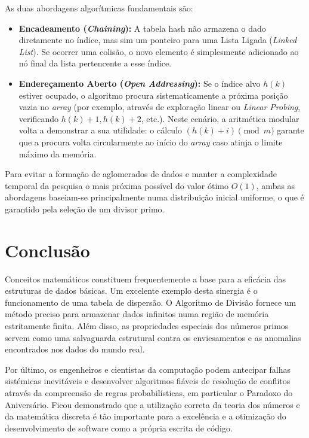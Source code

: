 \documentclass[12pt, a4paper]{article}
\begin{document}
As duas abordagens algorítmicas fundamentais são:
\begin{itemize}
    \item \textbf{Encadeamento (\textit{Chaining}):} A tabela hash não armazena o dado diretamente no índice, mas sim um ponteiro para uma Lista Ligada (\textit{Linked List}). 
    Se ocorrer uma colisão, o novo elemento é simplesmente adicionado ao nó final da lista pertencente a esse índice.
    \item \textbf{Endereçamento Aberto (\textit{Open Addressing}):} Se o índice alvo $h(k)$ estiver ocupado, o algoritmo procura sistematicamente a próxima posição vazia no \textit{array} 
    (por exemplo, através de exploração linear ou \textit{Linear Probing}, verificando $h(k)+1, h(k)+2$, etc.). Neste cenário, a aritmética modular volta a demonstrar a sua utilidade: o cálculo $(h(k) + i) \pmod{m}$ 
    garante que a procura volta circularmente ao início do \textit{array} caso atinja o limite máximo da memória.
\end{itemize}

Para evitar a formação de aglomerados de dados e manter a complexidade temporal da 
pesquisa o mais próxima possível do valor ótimo $O(1)$, ambas as abordagens baseiam-se 
principalmente numa distribuição inicial uniforme, o que é garantido pela seleção de um divisor primo.

\section{Conclusão}
Conceitos matemáticos constituem frequentemente a base para a eficácia das estruturas 
de dados básicas. Um excelente exemplo desta sinergia é o funcionamento de uma tabela de dispersão. 
O Algoritmo de Divisão fornece um método preciso para armazenar dados infinitos numa região de memória 
estritamente finita. Além disso, as propriedades especiais dos números primos servem como uma salvaguarda 
estrutural contra os enviesamentos e as anomalias encontrados nos dados do mundo real.

Por último, os engenheiros e cientistas da computação podem antecipar falhas sistémicas inevitáveis e 
desenvolver algoritmos fiáveis de resolução de conflitos através da compreensão de regras probabilísticas, 
em particular o Paradoxo do Aniversário. Ficou demonstrado que a utilização correta da teoria dos números e 
da matemática discreta é tão importante para a excelência e a otimização do desenvolvimento de software 
como a própria escrita de código.
\end{document}
